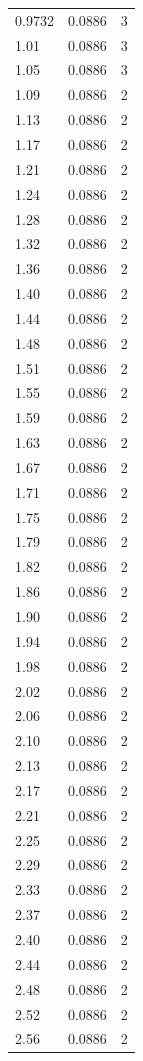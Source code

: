 \begin{longtable}{lrr}
  0.9732 & 0.0886 & 3 \\
  1.01 & 0.0886 & 3 \\
  1.05 & 0.0886 & 3 \\
  1.09 & 0.0886 & 2 \\
  1.13 & 0.0886 & 2 \\
  1.17 & 0.0886 & 2 \\
  1.21 & 0.0886 & 2 \\
  1.24 & 0.0886 & 2 \\
  1.28 & 0.0886 & 2 \\
  1.32 & 0.0886 & 2 \\
  1.36 & 0.0886 & 2 \\
  1.40 & 0.0886 & 2 \\
  1.44 & 0.0886 & 2 \\
  1.48 & 0.0886 & 2 \\
  1.51 & 0.0886 & 2 \\
  1.55 & 0.0886 & 2 \\
  1.59 & 0.0886 & 2 \\
  1.63 & 0.0886 & 2 \\
  1.67 & 0.0886 & 2 \\
  1.71 & 0.0886 & 2 \\
  1.75 & 0.0886 & 2 \\
  1.79 & 0.0886 & 2 \\
  1.82 & 0.0886 & 2 \\
  1.86 & 0.0886 & 2 \\
  1.90 & 0.0886 & 2 \\
  1.94 & 0.0886 & 2 \\
  1.98 & 0.0886 & 2 \\
  2.02 & 0.0886 & 2 \\
  2.06 & 0.0886 & 2 \\
  2.10 & 0.0886 & 2 \\
  2.13 & 0.0886 & 2 \\
  2.17 & 0.0886 & 2 \\
  2.21 & 0.0886 & 2 \\
  2.25 & 0.0886 & 2 \\
  2.29 & 0.0886 & 2 \\
  2.33 & 0.0886 & 2 \\
  2.37 & 0.0886 & 2 \\
  2.40 & 0.0886 & 2 \\
  2.44 & 0.0886 & 2 \\
  2.48 & 0.0886 & 2 \\
  2.52 & 0.0886 & 2 \\
  2.56 & 0.0886 & 2 \\

\end{longtable}
